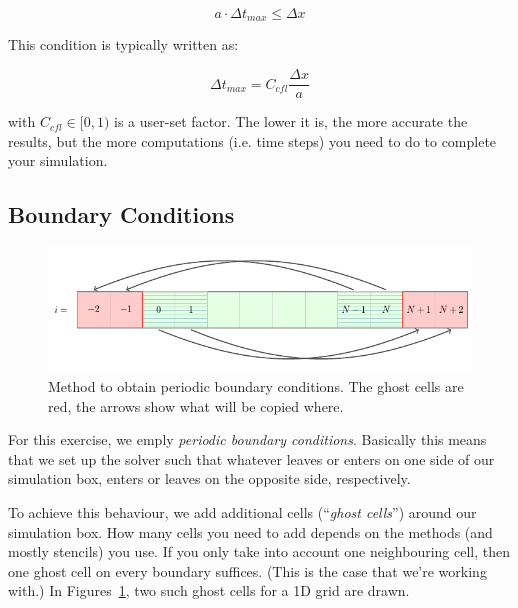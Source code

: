 \begin{equation}
	a \cdot \Delta t_{max} \leq \Delta x
\end{equation}

This condition is typically written as:

\begin{equation}
	\Delta t_{max} = C_{cfl} \frac{\Delta x}{a} \label{eq:CFL1D}
\end{equation}

with $C_{cfl} \in [0, 1) $ is a user-set factor.
The lower it is, the more accurate the results, but the more computations 
(i.e. time steps) you need to do to complete your simulation.






\subsection{Boundary Conditions}\label{chap:boundary-conditions}


\begin{figure}[htbp]
	\includegraphics[width=\textwidth]{./figures/boundary_periodic.pdf}%
	\caption{\label{fig:boundary_periodic}
		Method to obtain periodic boundary conditions.
		The ghost cells are red, the arrows show what will be copied where.
	}
\end{figure}



For this exercise, we emply \emph{periodic boundary conditions}. Basically this means
that we set up the solver such that whatever leaves or enters on one side of our simulation
box, enters or leaves on the opposite side, respectively.

To achieve this behaviour, we add additional cells (``\emph{ghost cells}'') around our simulation box.
How many cells you need to add depends on the methods (and mostly stencils) you use.
If you only take into account one neighbouring cell, then one ghost cell on every boundary suffices.
(This is the case that we're working with.)
In Figures~\ref{fig:boundary_periodic}, two such ghost cells for a 1D grid are drawn.


